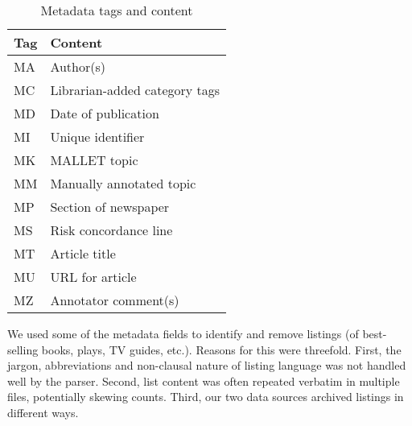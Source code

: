 

	\begin{table}\footnotesize \centering
    \begin{tabular}{|l|l|}
    \hline
    \textbf{Tag} & \textbf{Content}                                                     \\ \hline
    MA    & Author(s)                                                       \\ \hline
    MC    & Librarian-added category tags                                    \\ \hline
    MD    & Date of publication                                              \\ \hline
    MI    & Unique identifier                                            \\ \hline
    MK   & MALLET topic                                              \\ \hline
    MM    & Manually annotated topic                                      \\ \hline
    MP    & Section of newspaper \\ \hline
    MS    & Risk concordance line                             \\ \hline
    MT    & Article title                                                        \\ \hline
    MU    & URL for article                                              \\ \hline
    MZ    & Annotator comment(s)                                            \\ \hline
    \end{tabular}
    \caption{Metadata tags and content}
\end{table}
	
	We used some of the metadata fields to identify and remove listings (of best-selling books, plays, TV guides, etc.). Reasons for this were threefold. First, the jargon, abbreviations and non-clausal nature of listing language was not handled well by the parser. Second, list content was often repeated verbatim in multiple files, potentially skewing counts. Third, our two data sources archived listings in different ways.

